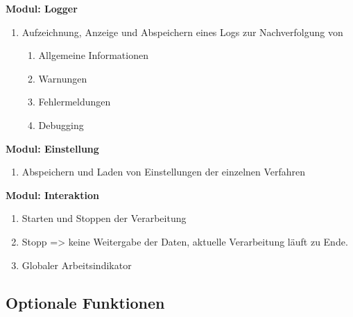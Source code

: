 \textbf{Modul: Logger}
\begin{enumerate}[ align=left, label={\textbf{\textbackslash FM4\arabic*0\textbackslash}} ]
	\item Aufzeichnung, Anzeige und Abspeichern eines Logs zur Nachverfolgung von
	\begin{enumerate}[ align=left, label={\textbf{\arabic*}} ]
		\item Allgemeine Informationen
		\item Warnungen
		\item Fehlermeldungen
		\item Debugging
	\end{enumerate}
\end{enumerate}
\textbf{Modul: Einstellung}
\begin{enumerate}[ align=left, label={\textbf{\textbackslash FM5\arabic*0\textbackslash}} ]
	\item Abspeichern und Laden von Einstellungen der einzelnen Verfahren
\end{enumerate}
\textbf{Modul: Interaktion}
\begin{enumerate}[ align=left, label={\textbf{\textbackslash FM6\arabic*0\textbackslash}} ]
	\item Starten und Stoppen der Verarbeitung
	\item Stopp => keine Weitergabe der Daten, aktuelle Verarbeitung läuft zu Ende.
	\item Globaler Arbeitsindikator
\end{enumerate}	

\subsection{Optionale Funktionen}

